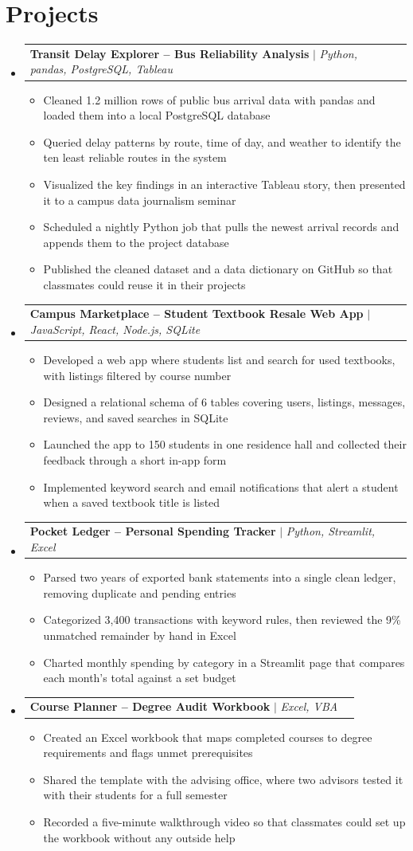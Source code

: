 \documentclass[letterpaper,11pt]{article}
\makeatletter
\newcommand{\resumeItem}[1]{\item\small{#1}}
\newcommand{\resumeProjectHeading}[2]{
    \item
    \begin{tabular*}{0.97\textwidth}{l@{\extracolsep{\fill}}r}
      \small#1 & #2 \\
    \end{tabular*}\vspace{2pt}
}
\newcommand{\resumeSubHeadingListStart}{\begin{itemize}[leftmargin=0.15in, label={}, itemsep=2pt, topsep=0pt, parsep=0pt, partopsep=0pt]}
\newcommand{\resumeSubHeadingListEnd}{\end{itemize}}
\newcommand{\resumeItemListStart}{\begin{itemize}[itemsep=0pt, topsep=0pt, parsep=0pt, partopsep=0pt]}
\newcommand{\resumeItemListEnd}{\end{itemize}}
\makeatother
\begin{document}
\section{Projects}
    \resumeSubHeadingListStart
      \resumeProjectHeading
          {\textbf{Transit Delay Explorer -- Bus Reliability Analysis} $|$ \emph{Python, pandas, PostgreSQL, Tableau}}{}
          \resumeItemListStart
            \resumeItem{Cleaned 1.2 million rows of public bus arrival data with pandas and loaded them into a local PostgreSQL database}
            \resumeItem{Queried delay patterns by route, time of day, and weather to identify the ten least reliable routes in the system}
            \resumeItem{Visualized the key findings in an interactive Tableau story, then presented it to a campus data journalism seminar}
            \resumeItem{Scheduled a nightly Python job that pulls the newest arrival records and appends them to the project database}
            \resumeItem{Published the cleaned dataset and a data dictionary on GitHub so that classmates could reuse it in their projects}
          \resumeItemListEnd
      \resumeProjectHeading
          {\textbf{Campus Marketplace -- Student Textbook Resale Web App} $|$ \emph{JavaScript, React, Node.js, SQLite}}{}
          \resumeItemListStart
            \resumeItem{Developed a web app where students list and search for used textbooks, with listings filtered by course number}
            \resumeItem{Designed a relational schema of 6 tables covering users, listings, messages, reviews, and saved searches in SQLite}
            \resumeItem{Launched the app to 150 students in one residence hall and collected their feedback through a short in-app form}
            \resumeItem{Implemented keyword search and email notifications that alert a student when a saved textbook title is listed}
          \resumeItemListEnd
      \resumeProjectHeading
          {\textbf{Pocket Ledger -- Personal Spending Tracker} $|$ \emph{Python, Streamlit, Excel}}{}
          \resumeItemListStart
            \resumeItem{Parsed two years of exported bank statements into a single clean ledger, removing duplicate and pending entries}
            \resumeItem{Categorized 3,400 transactions with keyword rules, then reviewed the 9\% unmatched remainder by hand in Excel}
            \resumeItem{Charted monthly spending by category in a Streamlit page that compares each month's total against a set budget}
          \resumeItemListEnd
      \resumeProjectHeading
          {\textbf{Course Planner -- Degree Audit Workbook} $|$ \emph{Excel, VBA}}{}
          \resumeItemListStart
            \resumeItem{Created an Excel workbook that maps completed courses to degree requirements and flags unmet prerequisites}
            \resumeItem{Shared the template with the advising office, where two advisors tested it with their students for a full semester}
            \resumeItem{Recorded a five-minute walkthrough video so that classmates could set up the workbook without any outside help}
          \resumeItemListEnd
    \resumeSubHeadingListEnd
\end{document}
